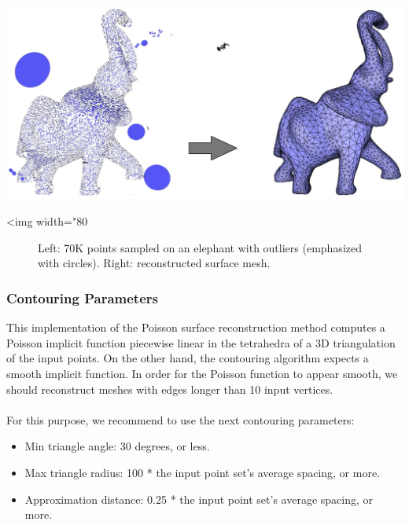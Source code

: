 \begin{center}
    \label{Surface_reconstruction_points_3-fig-outliers}
    \begin{ccTexOnly}
      \includegraphics[width=1.0\textwidth]{Surface_reconstruction_points_3/outliers} %
    \end{ccTexOnly}
    \begin{ccHtmlOnly}
        <img width="80%
    \end{ccHtmlOnly}
    \begin{figure}[h]
        \caption{Left: 70K points sampled on an elephant with outliers (emphasized with circles).
                 Right: reconstructed surface mesh.}
    \end{figure}
\end{center}


\subsubsection{Contouring Parameters}

This implementation of the Poisson surface reconstruction method computes a Poisson implicit function
piecewise linear in the tetrahedra of a 3D triangulation of the input points.
On the other hand, the contouring algorithm  expects a smooth implicit function.
In order for the Poisson function to appear smooth, we should reconstruct meshes with edges longer than 10 input vertices.\\
\\
For this purpose, we recommend to use the next contouring parameters:
\begin{itemize}
\item Min triangle angle: 30 degrees, or less.
\item Max triangle radius: 100 * the input point set's average spacing, or more.
\item Approximation distance: 0.25 * the input point set's average spacing, or more.
\end{itemize}

